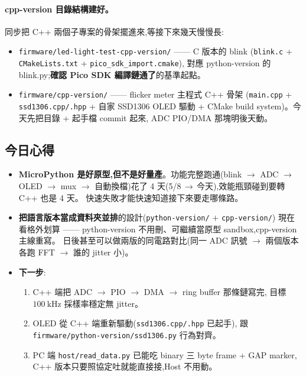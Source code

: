 \paragraph{cpp-version 目錄結構建好。}
\(\)同步把 C++ 兩個子專案的骨架擺進來,等接下來幾天慢慢長:

\begin{itemize}[leftmargin=2em,itemsep=0pt]
  \item \texttt{firmware/led-light-test-cpp-version/} —— C 版本的 blink
        (\texttt{blink.c} + \texttt{CMakeLists.txt} + \texttt{pico\_sdk\_import.cmake}),
        對應 python-version 的 blink.py;\textbf{確認 Pico SDK 編譯鏈通了}的基準起點。
  \item \texttt{firmware/cpp-version/} —— flicker meter 主程式 C++ 骨架
        (\texttt{main.cpp} + \texttt{ssd1306.cpp/.hpp} + 自家 SSD1306 OLED 驅動 +
        CMake build system)。今天先把目錄 + 起手檔 commit 起來,
        ADC PIO/DMA 那塊明後天動。
\end{itemize}

\subsection*{今日心得}

\begin{itemize}[leftmargin=2em,itemsep=0pt]
  \item \textbf{MicroPython 是好原型,但不是好量產}。功能完整跑通(blink \(\to\) ADC \(\to\) OLED \(\to\)
        mux \(\to\) 自動換檔)花了 4 天(5/8\,\(\to\)\,今天),效能瓶頸碰到要轉 C++ 也是 4 天。
        快速失敗才能快速知道接下來要走哪條路。
  \item \textbf{把語言版本當成資料夾並排}的設計(\texttt{python-version/} \(+\) \texttt{cpp-version/})
        現在看格外划算 —— python-version 不用刪、可繼續當原型 sandbox,cpp-version 主線重寫。
        日後甚至可以做兩版的同電路對比(同一 ADC 訊號 \(\to\) 兩個版本各跑 FFT \(\to\) 誰的 jitter 小)。
  \item \textbf{下一步}:
        \begin{enumerate}[leftmargin=2em,itemsep=0pt]
          \item C++ 端把 ADC \(\to\) PIO \(\to\) DMA \(\to\) ring buffer 那條鏈寫完,
                目標 \(\SI{100}{\kilo\hertz}\) 採樣率穩定無 jitter。
          \item OLED 從 C++ 端重新驅動(\texttt{ssd1306.cpp/.hpp} 已起手),
                跟 \texttt{firmware/python-version/ssd1306.py} 行為對齊。
          \item PC 端 \texttt{host/read\_data.py} 已能吃 binary 三 byte frame + GAP marker,
                C++ 版本只要照協定吐就能直接接,Host 不用動。
        \end{enumerate}
\end{itemize}
